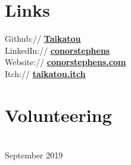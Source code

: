 \documentclass[]{deedy-resume-reversed}
\begin{document}
\begin{minipage}[t]{0.35\textwidth}

\section{Links}
Github://
\underline{
    \href{https://github.com/Taikatou}{\bf Taikatou}
}
\\
LinkedIn://
\underline{
    \href{https://www.linkedin.com/in/conorstephens/}{\bf conorstephens}
}
\\
Website://
\underline{
    \href{http://conorstephens.com}{\bf conorstephens.com}
}
\\
Itch://
\underline{
    \href{https://taikatou.itch.io/}{\bf taikatou.itch}
}
\sectionsep


\section{Volunteering}
 \\
September 2019


\end{minipage}
\end{document}
